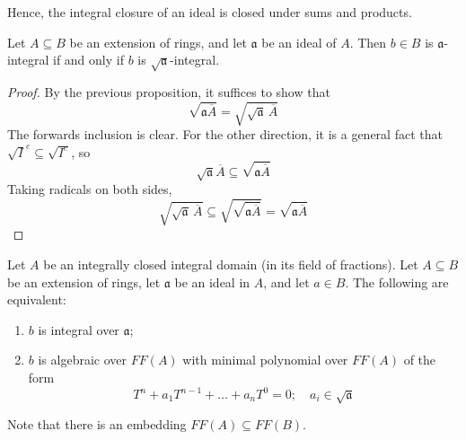 Hence, the integral closure of an ideal is closed under sums and products.
\begin{corollary}
    Let \( A \subseteq B \) be an extension of rings, and let \( \mathfrak a \) be an ideal of \( A \).
    Then \( b \in B \) is \( \mathfrak a \)-integral if and only if \( b \) is \( \sqrt{\mathfrak a} \)-integral.
\end{corollary}
\begin{proof}
    By the previous proposition, it suffices to show that
    \[ \sqrt{\mathfrak a \overline A} = \sqrt{\sqrt{\mathfrak a}\, \overline A} \]
    The forwards inclusion is clear.
    For the other direction, it is a general fact that \( \sqrt{I}^e \subseteq \sqrt{I^e} \), so
    \[ \sqrt{\mathfrak a} \overline A \subseteq \sqrt{\mathfrak a \overline A} \]
    Taking radicals on both sides,
    \[ \sqrt{\sqrt{\mathfrak a}\, \overline A} \subseteq \sqrt{\sqrt{\mathfrak a \overline A}} = \sqrt{\mathfrak a \overline A} \]
\end{proof}
\begin{proposition}
    Let \( A \) be an integrally closed integral domain (in its field of fractions).
    Let \( A \subseteq B \) be an extension of rings, let \( \mathfrak a \) be an ideal in \( A \), and let \( a \in B \).
    The following are equivalent:
    \begin{enumerate}
        \item \( b \) is integral over \( \mathfrak a \);
        \item \( b \) is algebraic over \( FF(A) \) with minimal polynomial over \( FF(A) \) of the form
        \[ T^n + a_1 T^{n-1} + \dots + a_n T^0 = 0;\quad a_i \in \sqrt{\mathfrak a} \]
    \end{enumerate}
\end{proposition}
Note that there is an embedding \( FF(A) \subseteq FF(B) \).
